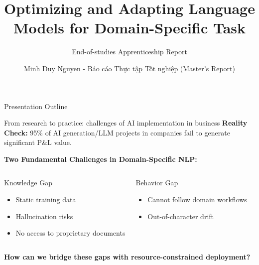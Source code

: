 \documentclass[11pt, aspectratio=169, xcolor=table]{beamer}
\title{Optimizing and Adapting Language Models for Domain-Specific Task}
\subtitle{End-of-studies Apprenticeship Report}
\author{Minh Duy Nguyen - Báo cáo Thực tập Tốt nghiệp (Master's Report)}
\institute{Milad Mozafari (Torus AI) \& David Bertoin (INSA Toulouse)}
\date{}
\begin{document}
\begin{frame}[plain]
    \titlepage
\end{frame}

\begin{frame}{Presentation Outline}
    \tableofcontents
\end{frame} 



\begin{frame}{From research to practice: challenges of AI implementation in business}
    \textbf{Reality Check:} 95\% of AI generation/LLM projects in companies fail to generate significant P\&L value.\\
    \vspace{0.3cm}
    
    \textbf{Two Fundamental Challenges in Domain-Specific NLP:}
    \vspace{0.2cm}
    
    \begin{columns}[T]
        \begin{alertblock}{Knowledge Gap}
            \begin{itemize}
                \item Static training data
                \item Hallucination risks
                \item No access to proprietary documents
            \end{itemize}
        \end{alertblock}

        \begin{alertblock}{Behavior Gap}
            \begin{itemize}
                \item Cannot follow domain workflows
                \item Out-of-character drift
            \end{itemize}
        \end{alertblock}
    \end{columns}

    \vspace{0.3cm}
    \begin{center}
        \textbf{\color{MainNavy} How can we bridge these gaps with resource-constrained deployment?}
    \end{center}
\end{frame}
\end{document}
